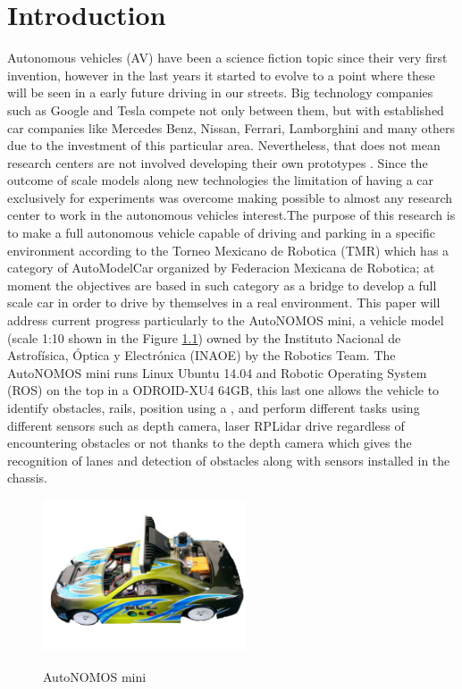 \chapter{Introduction}
\label{cha:introduction}
Autonomous vehicles (AV) have been a science fiction topic since their very first invention, however in the last years it started to evolve to a point where these will be seen in a early future driving in our streets. Big technology companies such as Google and Tesla compete not only between them, but with established car companies like Mercedes Benz, Nissan, Ferrari, Lamborghini and many others due to the investment of this particular area. Nevertheless, that does not mean research centers are not involved developing their own prototypes \cite{ModellingAutonomousVehicles}. Since the outcome of scale models along new technologies the limitation of having a car exclusively for experiments was overcome making possible to almost any research center to work in the autonomous vehicles interest.The purpose of this research is to make a full autonomous vehicle capable of driving and parking in a specific environment according to the Torneo Mexicano de Robotica (TMR) which has a category of AutoModelCar organized by Federacion Mexicana de Robotica; at moment the objectives are based in such category\cite{AutoModelCarRuleBook2019} as a bridge to develop a full scale car in order to drive by themselves in a real environment. This paper will address current progress particularly to the AutoNOMOS  mini, a vehicle model (scale 1:10 shown in the Figure \ref{fig:AutoNOMOS_mini}) owned by the Instituto Nacional de Astrofísica, Óptica y Electrónica (INAOE) by the Robotics Team. The AutoNOMOS mini runs Linux Ubuntu 14.04 and Robotic Operating System (ROS) on the top in a ODROID-XU4 64GB, this last one allows the vehicle to identify obstacles, rails, position using a , and perform different tasks using different sensors such as depth camera, laser RPLidar drive regardless of encountering obstacles or not thanks to the depth camera which gives the recognition of lanes and detection of obstacles along with sensors installed in the chassis.
\begin{figure}[h]
    \centering
    \includegraphics[width=6cm]{Figures/AutoNOMOS.jpg} \\[2mm]
    \caption{AutoNOMOS mini}
    \label{fig:AutoNOMOS_mini}
\end{figure}

